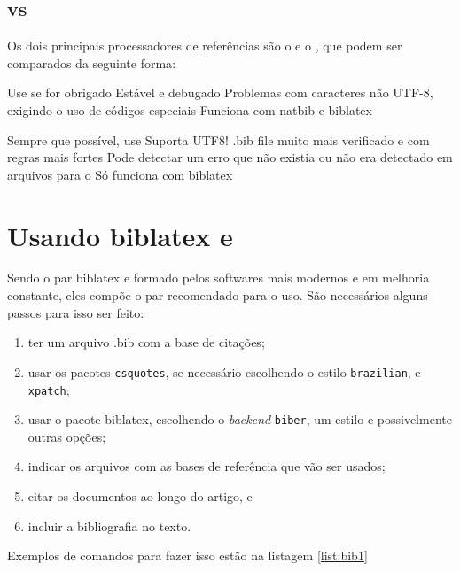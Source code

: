 \subsection{ vs }

Os dois principais processadores de referências são o  e o  , que podem ser comparados da seguinte forma\parencite{biber:2012}:
\begin{multicols}{2}
\begin{outline}
    \1 
    \2 Use se for obrigado
    \2 Estável e debugado
    \2 Problemas com caracteres não UTF-8, exigindo o uso de códigos especiais
    \2 Funciona com natbib e biblatex
\end{outline}
\columnbreak
\begin{outline}
    \1 
    \2 Sempre que possível, use
    \2 Suporta UTF8!
    \2 .bib file muito mais verificado e com regras mais fortes
    \3 Pode detectar um erro que não existia ou não era detectado em arquivos para o 
    \2 Só funciona com biblatex
\end{outline}
\end{multicols}



\section{Usando biblatex e  }

Sendo o par biblatex e  formado pelos
softwares mais modernos e em melhoria constante, eles compõe
o par recomendado para o uso. São necessários alguns passos 
para isso ser feito:
\begin{enumerate}
    \item ter um arquivo .bib com a base de citações;
    \item usar os pacotes \lstinline|csquotes|, se necessário escolhendo o estilo \lstinline|brazilian|, e \lstinline|xpatch|;
    \item usar o pacote biblatex, escolhendo o \textit{backend} \lstinline|biber|, um estilo e possivelmente outras opções; 
    \item indicar os arquivos com as bases de referência que vão ser usados;
    \item citar os documentos ao longo do artigo, e
    \item incluir a bibliografia no texto.
\end{enumerate}
Exemplos de comandos para fazer isso estão na listagem \ref{list:bib1}

